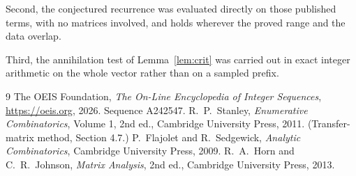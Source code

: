 \documentclass[11pt,a4paper]{article}
\theoremstyle{plain}
\theoremstyle{definition}
\begin{document}
Second, the conjectured recurrence was evaluated directly on those published terms, with no
matrices involved, and holds wherever the proved range and the data overlap.

Third, the annihilation test of Lemma~\ref{lem:crit} was carried out in exact integer
arithmetic on the whole vector rather than on a sampled prefix.

\begin{thebibliography}{9}
 The OEIS Foundation, \emph{The On-Line Encyclopedia of Integer
Sequences}, \url{https://oeis.org}, 2026. Sequence A242547.
 R.~P.~Stanley, \emph{Enumerative Combinatorics}, Volume 1, 2nd ed.,
Cambridge University Press, 2011. (Transfer-matrix method, Section 4.7.)
 P.~Flajolet and R.~Sedgewick, \emph{Analytic Combinatorics}, Cambridge
University Press, 2009.
 R.~A.~Horn and C.~R.~Johnson, \emph{Matrix Analysis}, 2nd ed., Cambridge
University Press, 2013.
\end{thebibliography}
\end{document}
